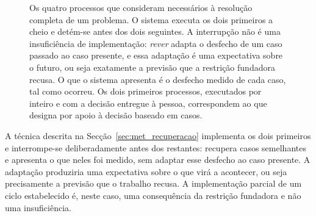 \begin{figure}[htbp]
\centering
{}
\caption[O ciclo do raciocínio baseado em casos, e onde o sistema para]{Os quatro processos que \textcite{aamodt1994cbr} consideram necessários à resolução completa de um problema. O sistema executa os dois primeiros a cheio e detém-se antes dos dois seguintes. A interrupção não é uma insuficiência de implementação: \emph{rever} adapta o desfecho de um caso passado ao caso presente, e essa adaptação é uma expectativa sobre o futuro, ou seja exatamente a previsão que a restrição fundadora recusa. O que o sistema apresenta é o desfecho medido de cada caso, tal como ocorreu. Os dois primeiros processos, executados por inteiro e com a decisão entregue à pessoa, correspondem ao que \textcite{kolodner1991aiding} designa por apoio à decisão baseado em casos.}
\label{fig:ctx_cbr}
\end{figure}
A técnica descrita na Secção~\ref{sec:met_recuperacao} implementa os dois primeiros e interrompe-se
deliberadamente antes dos restantes: recupera casos semelhantes e apresenta o que neles foi medido,
sem adaptar esse desfecho ao caso presente. A adaptação produziria uma expectativa sobre o que virá
a acontecer, ou seja precisamente a previsão que o trabalho recusa. A implementação parcial de um
ciclo estabelecido é, neste caso, uma consequência da restrição fundadora e não uma insuficiência.

